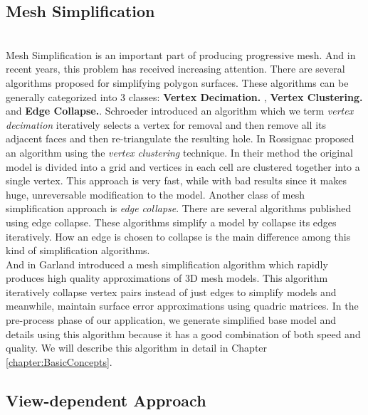 \subsection{Mesh Simplification}
\label{subsection:relWork:meshsimp}
\\
Mesh Simplification is an important part of producing progressive mesh. And in recent years, this problem has received increasing attention. There are several algorithms proposed for simplifying polygon surfaces. These algorithms can be generally categorized into 3 classes: \textbf{Vertex Decimation.	}, \textbf{Vertex Clustering.} and \textbf{Edge Collapse.}. 
Schroeder \etal \cite{Schroeder:1992:DTM} introduced an algorithm which we term \emph{vertex decimation} iteratively selects a vertex for removal and then remove all its adjacent faces and then re-triangulate the resulting hole. In \cite{Rossignac:93:MRARCS} Rossignac \etal proposed an algorithm using the \emph{vertex clustering} technique. In their method the original model is divided into a grid and vertices in each cell are clustered together into a single vertex. This approach is very fast, while with bad results since it makes huge, unreversable modification to the model. Another class of mesh simplification approach is \emph{edge collapse}. There are several algorithms \cite{Hoppe:1993:MO}\cite{Hoppe:1996:PM}\cite{RRR96}\cite{Gueziec:95:SSVT} published using edge collapse. These algorithms simplify a model by collapse its edges iteratively. How an edge is chosen to collapse is the main difference among this kind of simplification algorithms. \\
And in \cite{Garland:1997:SSU} Garland \etal introduced a mesh simplification algorithm which rapidly produces high quality approximations of 3D mesh models. This algorithm iteratively collapse vertex pairs instead of just edges to simplify models and meanwhile, maintain surface error approximations using quadric matrices. 
In the pre-process phase of our application, we generate simplified base model and details using this algorithm because it has a good combination of both speed and quality. We will describe this algorithm in detail in Chapter \ref{chapter:BasicConcepts}. 

\subsection{View-dependent Approach}
\label{subsection:relWork:vda}
\\


